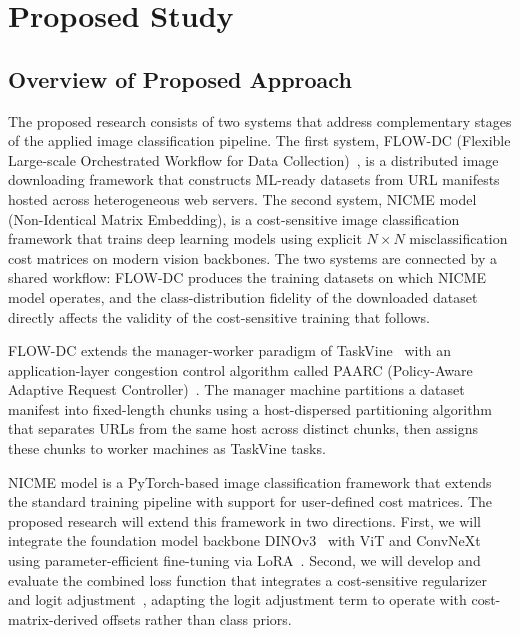 \documentclass[11pt, letterpaper]{article}
\begin{document}
\section{Proposed Study}
\label{sec:proposed_study}

\subsection{Overview of Proposed Approach}
\label{sec:overview}

The proposed research consists of two systems that address complementary stages
of the applied image classification pipeline. The first system, FLOW-DC
(Flexible Large-scale Orchestrated Workflow for Data
Collection)~\cite{deng2025flowdc}, is a distributed image downloading framework
that constructs ML-ready datasets from URL manifests hosted across heterogeneous
web servers. The second system, NICME model (Non-Identical Matrix Embedding), is a
cost-sensitive image classification framework that trains deep learning models
using explicit $N \times N$ misclassification cost matrices on modern vision
backbones. The two systems are connected by a shared workflow: FLOW-DC produces
the training datasets on which NICME model operates, and the class-distribution
fidelity of the downloaded dataset directly affects the validity of the
cost-sensitive training that follows.

FLOW-DC extends the manager-worker paradigm of
TaskVine~\cite{slydelgado2023taskvine} with an application-layer congestion
control algorithm called PAARC (Policy-Aware Adaptive Request
Controller)~\cite{deng2025flowdc}. The manager machine partitions a dataset manifest into fixed-length chunks using a host-dispersed partitioning algorithm that separates URLs from the same host across distinct chunks, then assigns these chunks to worker machines as TaskVine tasks.

NICME model is a PyTorch-based image classification framework that extends the
standard training pipeline with support for user-defined cost matrices.
The proposed research will extend this framework in two directions. First, we will integrate
the foundation model backbone
DINOv3~\cite{darcet2025dinov3} with ViT and ConvNeXt using parameter-efficient fine-tuning via
LoRA~\cite{hu2022lora}.
Second, we will develop and evaluate the combined loss function that integrates a cost-sensitive
regularizer~\cite{galdran2020} and logit adjustment~\cite{menon2021logitadjust}, adapting the logit adjustment term to
operate with cost-matrix-derived offsets rather than class priors.
\end{document}
